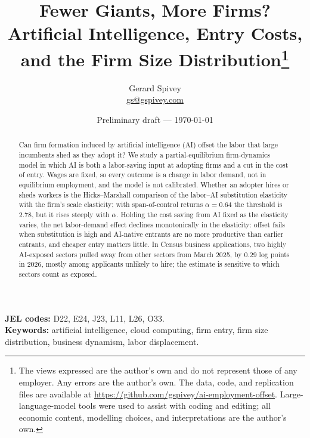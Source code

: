 \documentclass[11pt]{article}
\title{Fewer Giants, More Firms?\\Artificial Intelligence, Entry Costs, and the Firm Size Distribution\thanks{The views expressed are the author's own and do not represent those of any employer. Any errors are the author's own. The data, code, and replication files are available at \url{https://github.com/gspivey/ai-employment-offset}. Large-language-model tools were used to assist with coding and editing; all economic content, modelling choices, and interpretations are the author's own.}}
\author{Gerard Spivey\\\href{mailto:gs@gspivey.com}{gs@gspivey.com}}
\date{Preliminary draft --- \today}
\theoremstyle{plain}
\theoremstyle{definition}
\begin{document}
\maketitle

\begin{abstract}
\noindent
Can firm formation induced by artificial intelligence (AI) offset the labor that large incumbents shed as they adopt it?
We study a partial-equilibrium firm-dynamics model in which AI is both a labor-saving input at adopting firms and a cut in the cost of entry.
Wages are fixed, so every outcome is a change in labor demand, not in equilibrium employment, and the model is not calibrated.
Whether an adopter hires or sheds workers is the Hicks--Marshall comparison of the labor--AI substitution elasticity with the firm's scale elasticity; with span-of-control returns $\alpha = 0.64$ the threshold is $2.78$, but it rises steeply with $\alpha$.
Holding the cost saving from AI fixed as the elasticity varies, the net labor-demand effect declines monotonically in the elasticity: offset fails when substitution is high and AI-native entrants are no more productive than earlier entrants, and cheaper entry matters little.
In Census business applications, two highly AI-exposed sectors pulled away from other sectors from March 2025, by $0.29$ log points in 2026, mostly among applicants unlikely to hire; the estimate is sensitive to which sectors count as exposed.
\end{abstract}

\medskip
\noindent\textbf{JEL codes:} D22, E24, J23, L11, L26, O33.\\
\noindent\textbf{Keywords:} artificial intelligence, cloud computing, firm entry, firm size distribution, business dynamism, labor displacement.

\newpage













\clearpage
\appendix


\end{document}
